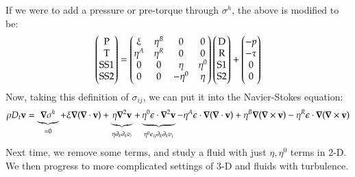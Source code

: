 If we were to add a pressure or pre-torque through $\sigma^h$, the above is modified to be:
\begin{equation}
        \begin{pmatrix}\text{P} \\ \text{T} \\ \text{SS1} \\ \text{SS2}\end{pmatrix} = \begin{pmatrix}\xi & \eta^B & 0 & 0 \\ \eta^A & \eta^R & 0 & 0 \\ 0 & 0 & \eta & \eta^0 \\ 0 & 0 & -\eta^0 & \eta\end{pmatrix}\begin{pmatrix}\text{D} \\ \text{R} \\ \text{S1} \\ \text{S2}\end{pmatrix} + \begin{pmatrix}-p \\ -\tau \\ 0 \\ 0\end{pmatrix}
\end{equation}
Now, taking this definition of $\sigma_{ij}$, we can put it into the Navier-Stokes equation:
\begin{equation}
    \rho D_t \v{v} = \underbrace{\nabla \sigma^h}_{=0} + \xi\nabla(\nabla \cdot \v{v}) + \underbrace{\eta\nabla^2\v{v}}_{\eta\p_k \p_k v_i} + \underbrace{\eta^0\e \cdot \nabla^2 \v{v}}_{\eta^0\e_{ij}\p_k\p_k v_j} - \eta^A \e \cdot\nabla(\nabla \cdot \v{v}) + \eta^B \nabla(\nabla \times \v{v}) - \eta^R \e \cdot \nabla(\nabla \times \v{v})
\end{equation}
Next time, we remove some terms, and study a fluid with just $\eta, \eta^0$ terms in 2-D. We then progress to more complicated settings of 3-D and fluids with turbulence.